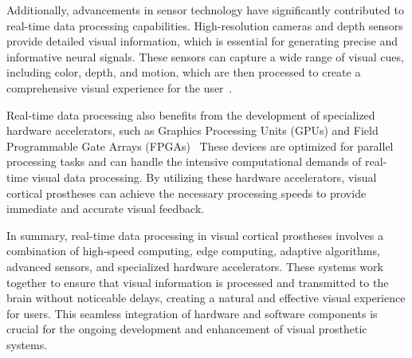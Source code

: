 \documentclass[twocolumn,10pt]{article}
\begin{document}
Additionally, advancements in sensor technology have significantly contributed
to real-time data processing capabilities. High-resolution cameras and depth
sensors provide detailed visual information, which is essential for generating
precise and informative neural signals. These sensors can capture a wide range
of visual cues, including color, depth, and motion, which are then processed to
create a comprehensive visual experience for the
user~\parencite{rueckauerExperiencingProstheticVision2022}.

Real-time data processing also benefits from the development of specialized
hardware accelerators, such as Graphics Processing Units (GPUs) and Field
Programmable Gate Arrays
(FPGAs)~\parencite{springerOnDeviceDeepLearning2021,fengDesignOnlineBrainComputer2020}
These devices are optimized for parallel processing tasks and can handle the
intensive computational demands of real-time visual data processing. By
utilizing these hardware accelerators, visual cortical prostheses can achieve
the necessary processing speeds to provide immediate and accurate visual
feedback.

In summary, real-time data processing in visual cortical prostheses involves a
combination of high-speed computing, edge computing, adaptive algorithms,
advanced sensors, and specialized hardware accelerators. These systems work
together to ensure that visual information is processed and transmitted to the
brain without noticeable delays, creating a natural and effective visual
experience for users. This seamless integration of hardware and software
components is crucial for the ongoing development and enhancement of visual
prosthetic systems.
\end{document}
